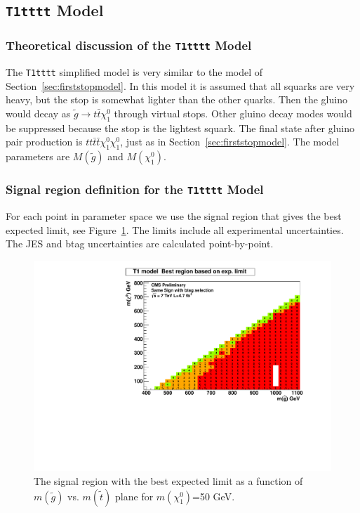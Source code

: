 \clearpage


\subsection{{\tt T1tttt} Model}
\label{t1ttmodel}

\subsubsection{Theoretical discussion of the {\tt T1tttt} Model}
\label{sec:t1tttheory}
The {\tt T1tttt} simplified model\cite{T1tttt} is very similar to the model of 
Section~\ref{sec:firststopmodel}.  In this model it is assumed that all squarks 
are very heavy, but the stop is somewhat lighter than the other 
quarks\cite{stopVirtual}\cite{stopVirtualPRD}.
Then the gluino would decay as $\widetilde{g} \to t\bar{t}\chi_1^0$ through virtual stops.
Other gluino decay modes would be suppressed because the stop is the lightest squark.
The final state after gluino pair production is $tt\bar{t}\bar{t}\chi_1^0\chi_1^0$,
just as in Section~\ref{sec:firststopmodel}.
The model parameters are $M(\widetilde{g})$ and $M(\chi_1^0)$.



\subsubsection{Signal region definition for the {\tt T1tttt} Model}
\label{sec:t1ttttdefinition}
For each point in parameter space we use the signal region that gives
the best expected limit, see Figure~\ref{fig:t1tttoptimize}.
The limits include all experimental 
uncertainties.   The JES and btag uncertainties are calculated point-by-point.


\begin{figure}[htb]
\begin{center}
\includegraphics[width=0.5\linewidth]{figs/T1tttt_BestSignalRegion.pdf}
\caption{The signal region with the best expected limit as a function of 
$m(\widetilde{g})$ vs. $m(\widetilde{t})$ plane for $m(\chi^0_1)$=50 GeV.
\label{fig:t1tttoptimize}}
\end{center}
\end{figure}



